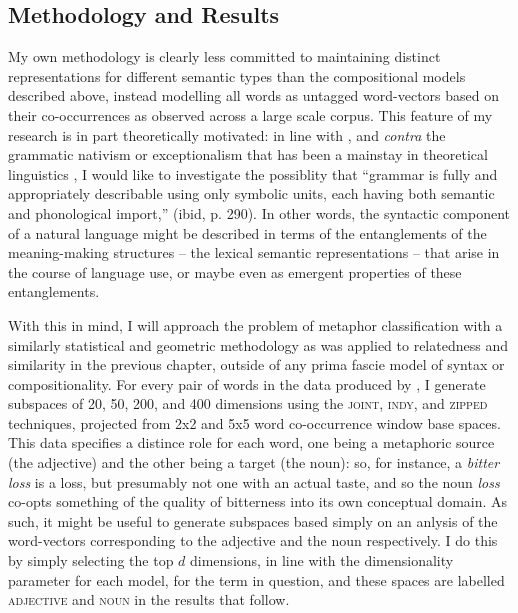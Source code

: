 
\subsection{Methodology and Results} \label{sec:metameth}
My own methodology is clearly less committed to maintaining distinct representations for different semantic types than the compositional models described above, instead modelling all words as untagged word-vectors based on their co-occurrences as observed across a large scale corpus.  This feature of my research is in part theoretically motivated: in line with \cite{Langacker1991}, and \emph{contra} the grammatic nativism or exceptionalism that has been a mainstay in theoretical linguistics \citep{Chomsky}, I would like to investigate the possiblity that ``grammar is fully and appropriately describable using only symbolic units, each having both semantic and phonological import,'' (ibid, p. 290).  In other words, the syntactic component of a natural language might be described in terms of the entanglements of the meaning-making structures -- the lexical semantic representations -- that arise in the course of language use, or maybe even as emergent properties of these entanglements.

With this in mind, I will approach the problem of metaphor classification with a similarly statistical and geometric methodology as was applied to relatedness and similarity in the previous chapter, outside of any prima fascie model of syntax or compositionality.  For every pair of words in the data produced by \cite{GutierrezEA2016}, I generate subspaces of 20, 50, 200, and 400 dimensions using the \textsc{joint}, \textsc{indy}, and \textsc{zipped} techniques, projected from 2x2 and 5x5 word co-occurrence window base spaces.  This data specifies a distince role for each word, one being a metaphoric source (the adjective) and the other being a target (the noun): so, for instance, a \emph{bitter loss} is a loss, but presumably not one with an actual taste, and so the noun \emph{loss} co-opts something of the quality of bitterness into its own conceptual domain.
As such, it might be useful to generate subspaces based simply on an anlysis of the word-vectors corresponding to the adjective and the noun respectively.  I do this by simply selecting the top $d$ dimensions, in line with the dimensionality parameter for each model, for the term in question, and these spaces are labelled \textsc{adjective} and \textsc{noun} in the results that follow.

